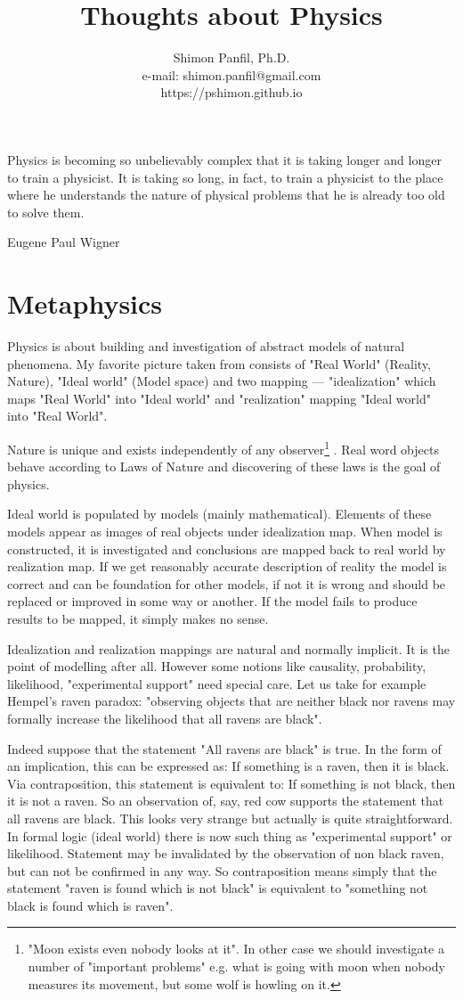 \documentclass[11pt]{book}
\title{Thoughts about Physics}
\author{Shimon Panfil, Ph.D.\\
e-mail: shimon.panfil@gmail.com\\
https://pshimon.github.io}
\begin{document}
  

\maketitle
\epigraph{Physics is becoming so unbelievably complex that it is taking longer
and longer to train a physicist. It is taking so long, in fact, to train a 
physicist to the place where he understands the nature of physical problems that 
he is already too old to solve them.}{Eugene Paul Wigner}
\tableofcontents                        
\chapter{Metaphysics }
\label {metaphysics}
Physics is about building and investigation of abstract models  of natural phenomena.
My favorite picture taken from \cite{strugatsky} consists of "Real World" (Reality, Nature), "Ideal world" (Model space)
and two mapping --- "idealization" which maps "Real World" into "Ideal world" and "realization"
mapping "Ideal world" into "Real World". 

Nature is unique and exists independently of any observer\footnote{"Moon exists even nobody looks at it".
In other case we should investigate a number of "important problems" e.g. what is going
with moon when nobody measures its movement, but some wolf is howling on it.}
. Real word objects behave 
according to Laws of Nature and discovering of these laws is the goal of physics.

Ideal world is populated by models (mainly mathematical). Elements of these models
appear as images of real objects under idealization map. When model is constructed, 
it is investigated and conclusions are mapped back to real world by realization map. 
If we get reasonably accurate description of reality the model is correct and can be foundation 
for other models, if not it is wrong and should be replaced or improved in some way or another.
If the model fails to produce results to be mapped, it simply makes no sense.

Idealization and realization mappings are natural and normally implicit. It is
the point of modelling after all. However some notions like causality, probability, likelihood,
"experimental support" need special care. Let us take for example  Hempel's raven paradox: "observing
objects that are neither black nor ravens may formally increase the likelihood 
that all ravens are black". 

Indeed suppose that the statement "All ravens are black" is true.
In the form of an 
implication, this can be expressed as: If something is a raven, then it 
is black. Via contraposition, this statement is equivalent to: If something is 
not black, then it is not a raven. So an observation of, say, red cow supports 
the statement that all ravens are black. This looks very strange but actually is quite
straightforward. In formal logic (ideal world) there is now such thing as "experimental support" or
likelihood. Statement may be invalidated by the observation of non black raven, but can not be confirmed in any way. So contraposition means simply that the statement "raven is found which is not black" is equivalent to "something not black is found which is raven". 
\end{document}
